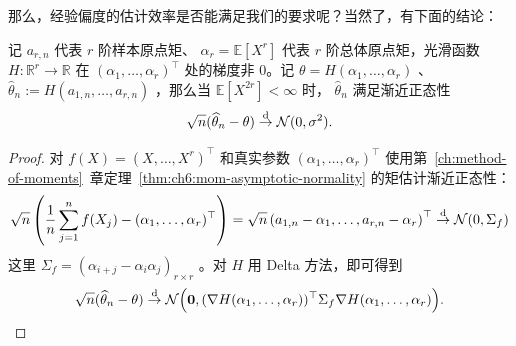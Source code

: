 那么，经验偏度的估计效率是否能满足我们的要求呢？当然了，有下面的结论：

\begin{lemma*}

记 $a_{r,n}$ 代表 $r$ 阶样本原点矩、 $\alpha_r=\mathbb E[X^r]$ 代表 $r$ 阶总体原点矩，光滑函数 $H:\mathbb R^r\to\mathbb R$ 在 $(\alpha_1,\dots,\alpha_r)^\top$ 处的梯度非 0。记 $\theta=H(\alpha_1,\dots,\alpha_r)$ 、 $\widehat\theta_n:=H(a_{1,n},\dots,a_{r,n})$ ，那么当 $\mathbb E[X^{2r}]<\infty$ 时， $\widehat\theta_n$ 满足渐近正态性
\[
\sqrt n(\widehat\theta_n-\theta)\overset{\rm d}\to\mathcal N(0,\sigma^2).
\]

\end{lemma*}

\begin{proof}

对 $f(X)=(X,\dots, X^r)^\top$ 和真实参数 $(\alpha_1,\dots,\alpha_r)^\top$ 使用第~\ref{ch:method-of-moments}~章定理~\ref{thm:ch6:mom-asymptotic-normality} 的矩估计渐近正态性：
\[\sqrt n\left(\frac1n\sum_{j=1}^nf(X_j)-(\alpha_1,\dots,\alpha_r)^\top\right)=\sqrt n\left(a_{1,n}-\alpha_1,\dots,a_{r,n}-\alpha_r\right)^\top\overset{\rm d}\to \mathcal N(0,\Sigma_f)\]
这里 $\Sigma_f=(\alpha_{i+j}-\alpha_i\alpha_j)_{r\times r}$ 。对 $H$ 用 Delta 方法，即可得到
\[
\sqrt n(\widehat \theta_n-\theta)\overset{\rm d}\to \mathcal N\Big(\bm 0,(\nabla H(\alpha_1,\dots,\alpha_r))^\top \Sigma_f \nabla H(\alpha_1,\dots,\alpha_r)\Big).
\]

\end{proof}

